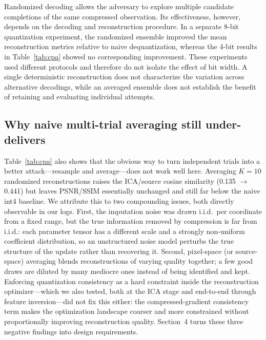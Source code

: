 \documentclass{article}
\begin{document}
Randomized decoding allows the adversary to explore multiple candidate
completions of the same compressed observation. Its effectiveness,
however, depends on the decoding and reconstruction procedure.
In a separate 8-bit quantization experiment, the randomized ensemble
improved the mean reconstruction metrics relative to naive
dequantization, whereas the 4-bit results in Table~\ref{tab:cpa}
showed no corresponding improvement. These experiments used different
protocols and therefore do not isolate the effect of bit width.
A single deterministic reconstruction does not characterize the
variation across alternative decodings, while an averaged ensemble
does not establish the benefit of retaining and evaluating individual
attempts.

\subsection{Why naive multi-trial averaging still under-delivers}
Table~\ref{tab:cpa} also shows that the obvious way to turn independent
trials into a better attack---resample and average---does not work well
here. Averaging $K{=}10$ randomized reconstructions raises the ICA/source
cosine similarity (0.135 $\to$ 0.441) but leaves PSNR/SSIM essentially
unchanged and still far below the naive int4 baseline. We attribute this to
two compounding issues, both directly observable in our logs. First, the
imputation noise was drawn i.i.d.\ per coordinate from a fixed range, but the
true information removed by compression is far from i.i.d.: each parameter
tensor has a different scale and a strongly non-uniform coefficient
distribution, so an unstructured noise model perturbs the true structure of
the update rather than recovering it. Second, pixel-space (or source-space)
averaging blends reconstructions of varying quality together; a few good
draws are diluted by many mediocre ones instead of being identified and kept.
Enforcing quantization consistency as a hard constraint inside the
reconstruction optimizer---which we also tested, both at the ICA stage and
end-to-end through feature inversion---did not fix this either: the
compressed-gradient consistency term makes the optimization landscape
coarser and more constrained without proportionally improving reconstruction
quality. Section~4 turns these three negative findings into design
requirements.
\end{document}
